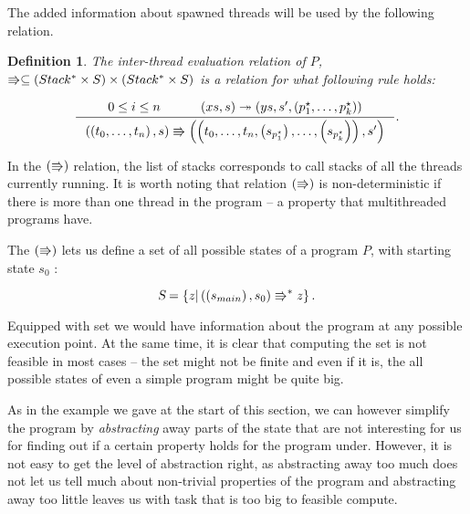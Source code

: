 \documentclass[..thesis.tex]{subfiles}
\newtheorem{defin}{Definition}[section]
\begin{document}

The added information about spawned threads will be used by the following relation.

\begin{defin}

 The inter-thread evaluation relation of $P$, $\Rrightarrow \subseteq \left( Stack^\ast \times S \right) \times \left( Stack^\ast \times S \right)$ is a relation for what following rule holds:   

\begin{equation*}
  \inference{ 0 \leq i \leq n  \separ \lp xs , s \rp \intrathread \lp ys, s', \lp p_1^\star, \ldots, p_k^{\star} \rp \rp}{ \lp \lp t_0, \ldots, t_n \rp, s \rp \interthread  \lp \lp t_0, \ldots, t_n, \lp s_{p_1^{\star}} \rp, \ldots, \lp s_{p_k^{\star}} \rp  \rp , s' \rp} \text{.}
\end{equation*}

\end{defin}

In the $\left( \Rrightarrow \right)$ relation, the list of stacks corresponds to call stacks of all the threads currently running. It is worth noting that relation $\left( \Rrightarrow \right)$ is non-deterministic if there is more than one thread in the program -- a property that multithreaded programs have.

The $\left( \Rrightarrow \right)$ lets us define a set of all possible states of a program $P$, with starting state $s_0$ :

\begin{equation*}
\textsl{S} = \left\lbrace  z | \left( \left( s_{main} \right), s_0 \right) \Rrightarrow^{\ast} z \right\rbrace \text{.}
\end{equation*}



Equipped with set \allstates we would have information about the program at any possible execution point. At the same time, it is clear that computing the set \allstates is not feasible in most cases -- the set might not be finite and even if it is, the all possible states of even a simple program might be quite big.

As in the example we gave at the start of this section, we can however simplify the program by \textit{abstracting} away parts of the state that are not interesting for us for finding out if a certain property holds for the program under. However, it is not easy to get the level of abstraction right, as abstracting away too much does not let us tell much about non-trivial properties of the program and abstracting away too little leaves us with task that is too big to feasible compute.
\end{document}
